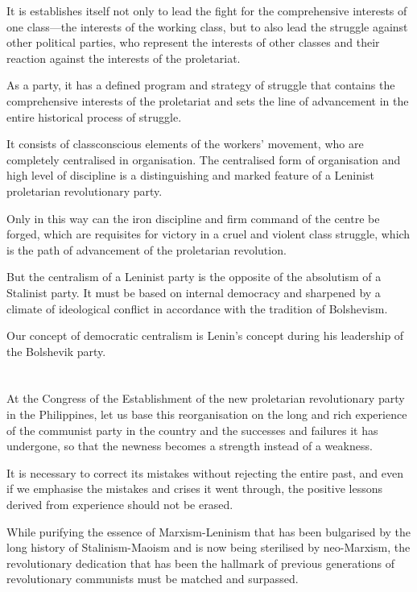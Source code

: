 It is establishes itself 
not only to lead the fight for 
the comprehensive interests of one 
class---the interests of the working class,
but to also lead the struggle against other political parties,
who represent the interests of other classes 
and their reaction against the interests of the proletariat.

As a party, 
it has a defined program and strategy of struggle 
that contains the comprehensive interests 
of the proletariat 
and sets the line of advancement 
in the entire historical process of struggle.

It consists of classconscious elements of the workers' movement,
who are completely centralised in organisation. 
The centralised form of organisation 
and high level of discipline 
is a distinguishing and marked feature 
of a Leninist proletarian revolutionary party.

Only in this way can the iron discipline 
and firm command of the centre
be forged,
which are requisites for victory 
in a cruel and violent class struggle,
which is the path of advancement of the proletarian revolution.

But the centralism of a Leninist party 
is the opposite of the absolutism of a Stalinist party. 
It must be based on internal democracy 
and sharpened by a climate of ideological conflict 
in accordance with the tradition of Bolshevism.

Our concept of democratic centralism 
is Lenin's concept during his leadership of the Bolshevik party.

\section{}
At the Congress of the Establishment 
of the new proletarian revolutionary party in the Philippines, 
let us base this reorganisation 
on the long and rich experience of the communist party 
in the country and the successes and failures it has undergone,
so that the newness becomes a strength instead of a weakness.

It is necessary to correct 
its mistakes 
without rejecting the entire past,
and even if we emphasise the mistakes and crises it went through, 
the positive lessons derived from experience should not be erased.

While purifying the essence of Marxism-Leninism 
that has been bulgarised by the long history of Stalinism-Maoism 
and is now being sterilised by neo-Marxism, 
the revolutionary dedication that has been 
the hallmark of previous generations of revolutionary communists 
must be matched and surpassed.

